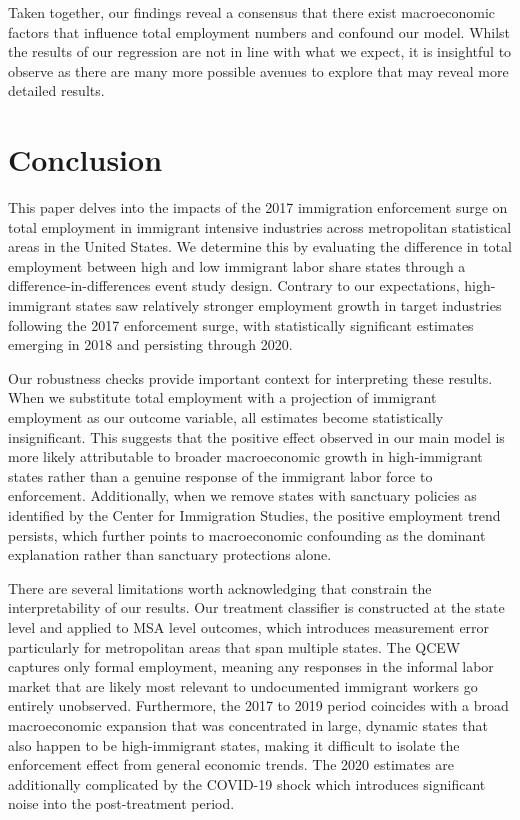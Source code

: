 \documentclass[12pt]{article}
\begin{document}
Taken together, our findings reveal a consensus that there exist macroeconomic factors that influence total employment numbers and confound our model. Whilst the results of our regression are not in line with what we expect, it is insightful to observe as there are many more possible avenues to explore that may reveal more detailed results.

 

\section{Conclusion}

 
This paper delves into the impacts of the 2017 immigration enforcement surge on total employment in immigrant intensive industries across metropolitan statistical areas in the United States. We determine this by evaluating the difference in total employment between high and low immigrant labor share states through a difference-in-differences event study design. Contrary to our expectations, high-immigrant states saw relatively stronger employment growth in target industries following the 2017 enforcement surge, with statistically significant estimates emerging in 2018 and persisting through 2020.

Our robustness checks provide important context for interpreting these results. When we substitute total employment with a projection of immigrant employment as our outcome variable, all estimates become statistically insignificant. This suggests that the positive effect observed in our main model is more likely attributable to broader macroeconomic growth in high-immigrant states rather than a genuine response of the immigrant labor force to enforcement. Additionally, when we remove states with sanctuary policies as identified by the Center for Immigration Studies, the positive employment trend persists, which further points to macroeconomic confounding as the dominant explanation rather than sanctuary protections alone.

There are several limitations worth acknowledging that constrain the interpretability of our results. Our treatment classifier is constructed at the state level and applied to MSA level outcomes, which introduces measurement error particularly for metropolitan areas that span multiple states. The QCEW captures only formal employment, meaning any responses in the informal labor market that are likely most relevant to undocumented immigrant workers go entirely unobserved. Furthermore, the 2017 to 2019 period coincides with a broad macroeconomic expansion that was concentrated in large, dynamic states that also happen to be high-immigrant states, making it difficult to isolate the enforcement effect from general economic trends. The 2020 estimates are additionally complicated by the COVID-19 shock which introduces significant noise into the post-treatment period.
\end{document}
